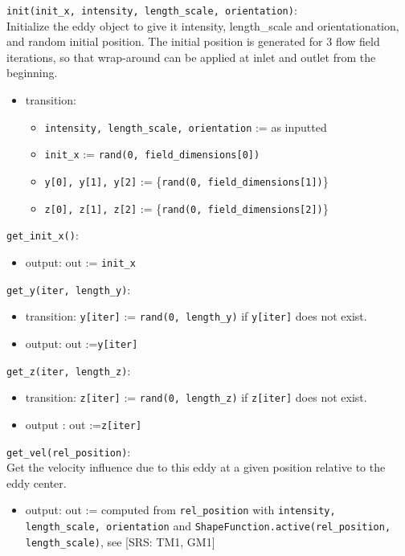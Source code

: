 \documentclass[12pt, titlepage]{article}
\begin{document}
\noindent \texttt{init(init\_x, intensity, length\_scale, orientation)}:\\
Initialize the eddy object to give it intensity, length\_scale and orientationation, and random initial position. The initial position is generated for 3 flow field iterations, so that wrap-around can be applied at inlet and outlet from the beginning.
\begin{itemize}
\item transition: 
  \begin{itemize}
  \item \texttt{intensity, length\_scale, orientation} := as inputted
  \item \texttt{init\_x} := \texttt{rand(0, field\_dimensions[0])}
  \item \texttt{y[0], y[1], y[2]} := \{\texttt{rand(0, field\_dimensions[1])}\}
  \item \texttt{z[0], z[1], z[2]} := \{\texttt{rand(0, field\_dimensions[2])}\}
  \end{itemize}
\end{itemize}

\noindent \texttt{get\_init\_x()}:
\begin{itemize}
  \item output: out := \texttt{init\_x}
\end{itemize}

\noindent \texttt{get\_y(iter, length\_y)}:
\begin{itemize}
  \item transition: \texttt{y[iter]} := \texttt{rand(0, length\_y)} if \texttt{y[iter]} does not exist.
  \item output: out :=\texttt{y[iter]}
\end{itemize}

\noindent \texttt{get\_z(iter, length\_z)}:
\begin{itemize}
  \item transition: \texttt{z[iter]} := \texttt{rand(0, length\_z)} if \texttt{z[iter]} does not exist.
  \item output
  : out :=\texttt{z[iter]}
\end{itemize}
\noindent \texttt{get\_vel(rel\_position)}:\\
Get the velocity influence due to this eddy at a given position relative to the eddy center.
\begin{itemize}
  \item output: out := computed from \texttt{rel\_position} with \texttt{intensity, length\_scale, orientation} and \texttt{ShapeFunction.active(rel\_position, length\_scale)}, see [SRS: TM1, GM1]
\end{itemize}
\end{document}
